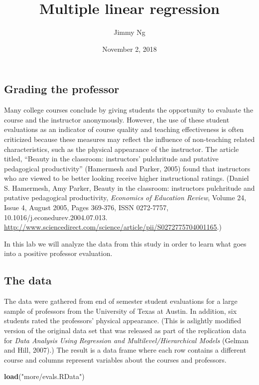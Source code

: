 \documentclass[]{article}
\title{Multiple linear regression}
\author{Jimmy Ng}
\date{November 2, 2018}
\newenvironment{Shaded}{\begin{snugshade}}{\end{snugshade}}
\newcommand{\KeywordTok}[1]{\textcolor[rgb]{0.13,0.29,0.53}{\textbf{#1}}}
\newcommand{\StringTok}[1]{\textcolor[rgb]{0.31,0.60,0.02}{#1}}
\newcommand{\NormalTok}[1]{#1}
\begin{document}
\maketitle

\subsection{Grading the professor}\label{grading-the-professor}

Many college courses conclude by giving students the opportunity to
evaluate the course and the instructor anonymously. However, the use of
these student evaluations as an indicator of course quality and teaching
effectiveness is often criticized because these measures may reflect the
influence of non-teaching related characteristics, such as the physical
appearance of the instructor. The article titled, ``Beauty in the
classroom: instructors' pulchritude and putative pedagogical
productivity'' (Hamermesh and Parker, 2005) found that instructors who
are viewed to be better looking receive higher instructional ratings.
(Daniel S. Hamermesh, Amy Parker, Beauty in the classroom: instructors
pulchritude and putative pedagogical productivity, \emph{Economics of
Education Review}, Volume 24, Issue 4, August 2005, Pages 369-376, ISSN
0272-7757, 10.1016/j.econedurev.2004.07.013.
\url{http://www.sciencedirect.com/science/article/pii/S0272775704001165}.)

In this lab we will analyze the data from this study in order to learn
what goes into a positive professor evaluation.

\subsection{The data}\label{the-data}

The data were gathered from end of semester student evaluations for a
large sample of professors from the University of Texas at Austin. In
addition, six students rated the professors' physical appearance. (This
is aslightly modified version of the original data set that was released
as part of the replication data for \emph{Data Analysis Using Regression
and Multilevel/Hierarchical Models} (Gelman and Hill, 2007).) The result
is a data frame where each row contains a different course and columns
represent variables about the courses and professors.

\begin{Shaded}
\begin{Highlighting}[]
\KeywordTok{load}\NormalTok{(}\StringTok{"more/evals.RData"}\NormalTok{)}
\end{Highlighting}
\end{Shaded}
\end{document}
